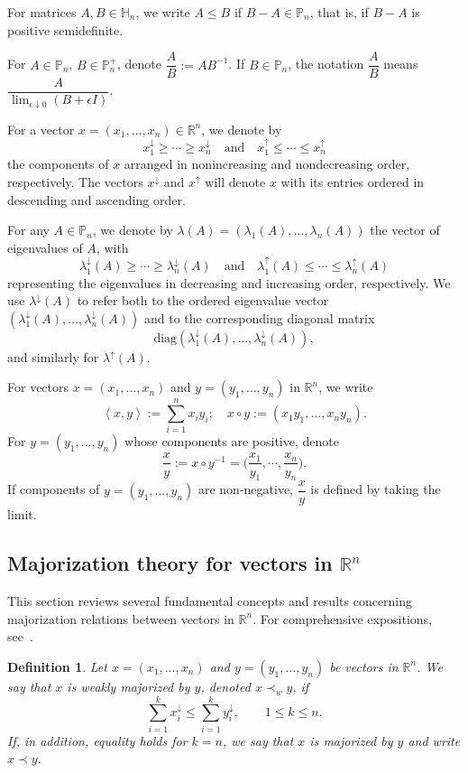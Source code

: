 \documentclass[10pt,reqno]{amsart}
\theoremstyle{break-italic}
\theoremstyle{break-italic}
\theoremstyle{break-italic}
\theoremstyle{break-italic}
\theoremstyle{break-italic}
\theoremstyle{break-italic}
\theoremstyle{break-italic}
\theoremstyle{break-italic}
\theoremstyle{break-roman}
\newtheorem{definition}[satz]{Definition}
\theoremstyle{standard}
\theoremstyle{varthm-roman}
\theoremstyle{varthm-italic}
\theoremstyle{varthm-roman-break}
\theoremstyle{varthm-italic-break}
\theoremstyle{varthm-roman-no-punctuation}
\theoremstyle{varthm-italic-no-punctuation}
\numberwithin{equation}{section}
\newcommand{\seq}[1]{\left<#1\right>}
\begin{document}
For matrices $A, B \in \mathbb{H}_n$, we write $A \le B$ if $B - A \in \mathbb{P}_n$, that is, if $B - A$ is positive semidefinite.

For $A \in \mathbb{P}_n$, $B \in \mathbb{P}_n^+$, denote $\dfrac{A}{B}:=AB^{-1}$. If $B \in \mathbb{P}_n$, the notation $\dfrac{A}{B}$ means  $\dfrac{A}{\displaystyle\lim_{\epsilon \downarrow 0}(B+\epsilon I)}$.

For a vector $x = (x_1, \dots, x_n) \in \mathbb{R}^n$, we denote by 
\[
x_1^\downarrow \ge \cdots \ge x_n^\downarrow
\quad \text{and} \quad
x_1^\uparrow \le \cdots \le x_n^\uparrow
\]
the components of $x$ arranged in nonincreasing and nondecreasing order, respectively. The vectors $x^\downarrow$ and $x^\uparrow$ will denote $x$ with its entries ordered in descending and ascending order.

For any $A \in \mathbb{P}_n$, we denote by $\lambda(A) = (\lambda_1(A), \dots, \lambda_n(A))$ the vector of eigenvalues of $A$, with
\[
\lambda_1^\downarrow(A) \ge \cdots \ge \lambda_n^\downarrow(A)
\quad \text{and} \quad
\lambda_1^\uparrow(A) \le \cdots \le \lambda_n^\uparrow(A)
\]
representing the eigenvalues in decreasing and increasing order, respectively. We use $\lambda^\downarrow(A)$ to refer both to the ordered eigenvalue vector $(\lambda_1^\downarrow(A), \dots, \lambda_n^\downarrow(A))$ and to the corresponding diagonal matrix 
\[
\text{diag}(\lambda_1^\downarrow(A), \dots, \lambda_n^\downarrow(A)),
\]
and similarly for $\lambda^\uparrow(A)$.

For vectors $x = (x_1, \dots, x_n)$ and $y = (y_1, \dots, y_n)$ in $\mathbb{R}^n$, we write 
$$\seq{x, y} := \sum_{i=1}^n x_i y_i; \quad x \circ y := (x_1 y_1, \dots, x_n y_n).$$
For $y = (y_1, \dots, y_n)$ whose components are positive, denote
$$\dfrac{x}{y}:=x\circ y^{-1}= \big(\dfrac{x_1}{y_1},\cdots, \dfrac{x_n}{y_n}\big). $$
If components of $y = (y_1, \dots, y_n)$ are non-negative,  $\dfrac{x}{y}$ is defined by taking the limit. 

\subsection{Majorization theory for vectors in $\mathbb R^n$}
This section reviews several fundamental concepts and results concerning majorization relations between vectors in $\mathbb{R}^n$. For comprehensive expositions, see~\cite{Bh,MOA}.

\begin{definition}
Let $x = (x_1, \dots, x_n)$ and $y = (y_1, \dots, y_n)$ be vectors in $\mathbb{R}^n$. We say that $x$ is \emph{weakly majorized by} $y$, denoted $x \prec_w y$, if
\[
\sum_{i=1}^k x_i^\downarrow \le \sum_{i=1}^k y_i^\downarrow, \qquad 1 \le k \le n.
\]
If, in addition, equality holds for $k = n$, we say that $x$ is \emph{majorized by} $y$ and write $x \prec y$.
\end{definition}
\end{document}
